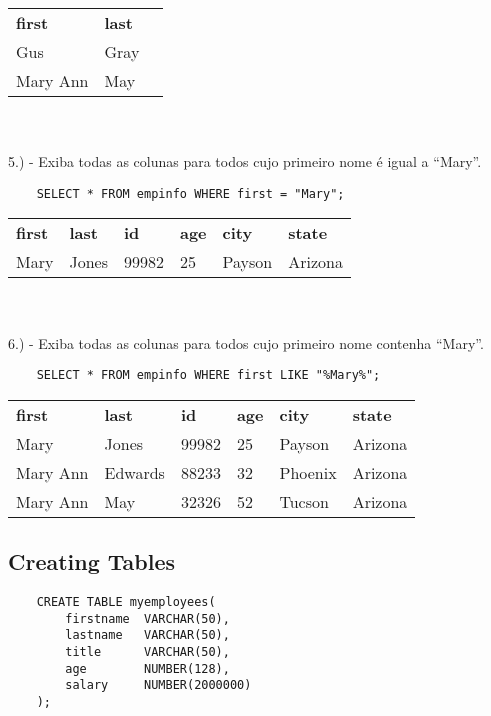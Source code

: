 \begin{tabular}{l l l}
    {\textbf{first}} & {\textbf{last}}\\
    {Gus}            & {Gray}         \\
    {Mary Ann}       & {May}
\end{tabular} \\ \\

5.) - Exiba todas as colunas para todos cujo primeiro nome é igual a “Mary”.

\begin{lstlisting}
    SELECT * FROM empinfo WHERE first = "Mary";
\end{lstlisting}

\begin{tabular}{l l l l l l}
    {\textbf{first}} & {\textbf{last}} & {\textbf{id}} & {\textbf{age}} & {\textbf{city}} & {\textbf{state}} \\
    {Mary}           & {Jones}         & {99982}       & {25}           & {Payson}        & {Arizona}       
\end{tabular} \\ \\ 

6.) - Exiba todas as colunas para todos cujo primeiro nome contenha “Mary”.

\begin{lstlisting}
    SELECT * FROM empinfo WHERE first LIKE "%Mary%";
\end{lstlisting}

\begin{tabular}{llllll}
    {\textbf{first}} & {\textbf{last}} & {\textbf{id}} & {\textbf{age}} & {\textbf{city}} & {\textbf{state}} \\
    {Mary}      & {Jones}    & {99982}    & {25}    & {Payson}   & {Arizona}        \\
    Mary Ann    & Edwards    & 88233      & 32      & Phoenix    & Arizona          \\
    Mary Ann    & May        & 32326      & 52      & Tucson     & Arizona                              
\end{tabular}


\subsection{Creating Tables}

\begin{lstlisting}
    CREATE TABLE myemployees(
        firstname  VARCHAR(50),
        lastname   VARCHAR(50),
        title      VARCHAR(50),
        age        NUMBER(128),
        salary     NUMBER(2000000)
    );
\end{lstlisting}


